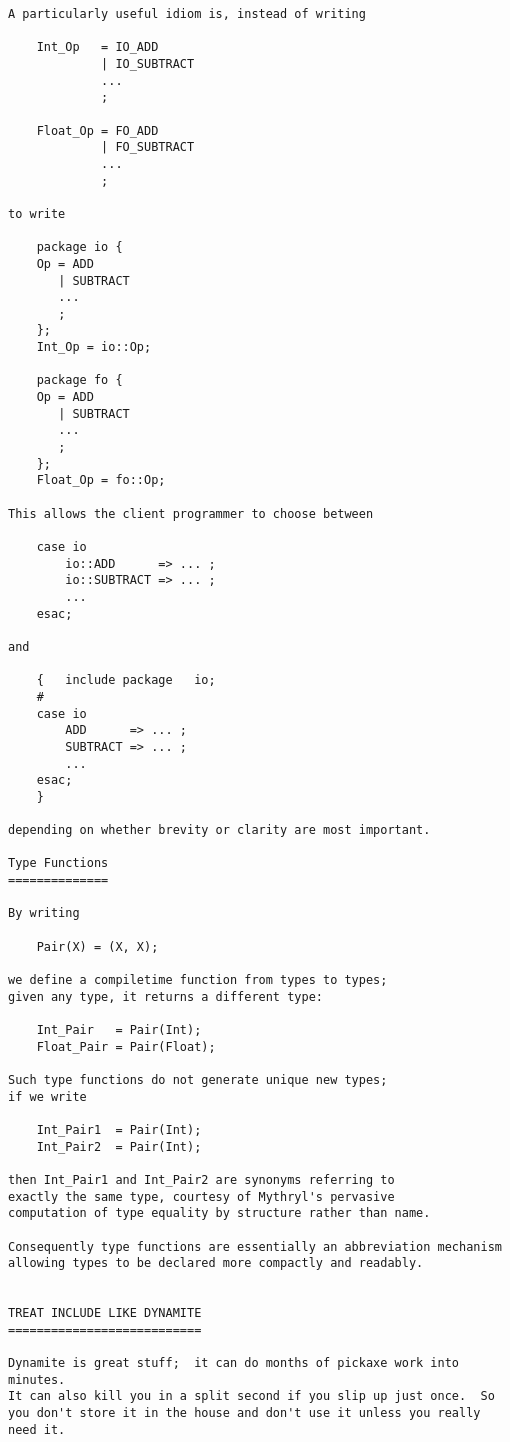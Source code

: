 \begin{verbatim}
A particularly useful idiom is, instead of writing 

    Int_Op   = IO_ADD 
             | IO_SUBTRACT 
             ...
             ;

    Float_Op = FO_ADD 
             | FO_SUBTRACT 
             ...
             ;

to write 

    package io {
	Op = ADD 
	   | SUBTRACT 
	   ...
	   ;
    }; 
    Int_Op = io::Op;
        
    package fo { 
	Op = ADD 
	   | SUBTRACT 
	   ... 
	   ; 
    }; 
    Float_Op = fo::Op; 
        
This allows the client programmer to choose between 

    case io 
        io::ADD      => ... ; 
        io::SUBTRACT => ... ; 
        ... 
    esac; 

and 

    {   include package   io; 
	# 
	case io 
	    ADD      => ... ; 
	    SUBTRACT => ... ; 
	    ... 
	esac; 
    } 

depending on whether brevity or clarity are most important. 

Type Functions 
============== 

By writing 

    Pair(X) = (X, X); 

we define a compiletime function from types to types; 
given any type, it returns a different type: 

    Int_Pair   = Pair(Int); 
    Float_Pair = Pair(Float); 

Such type functions do not generate unique new types; 
if we write 

    Int_Pair1  = Pair(Int); 
    Int_Pair2  = Pair(Int); 

then Int_Pair1 and Int_Pair2 are synonyms referring to 
exactly the same type, courtesy of Mythryl's pervasive 
computation of type equality by structure rather than name. 

Consequently type functions are essentially an abbreviation mechanism 
allowing types to be declared more compactly and readably. 


TREAT INCLUDE LIKE DYNAMITE 
=========================== 

Dynamite is great stuff;  it can do months of pickaxe work into minutes. 
It can also kill you in a split second if you slip up just once.  So 
you don't store it in the house and don't use it unless you really need it. 


\end{verbatim}
